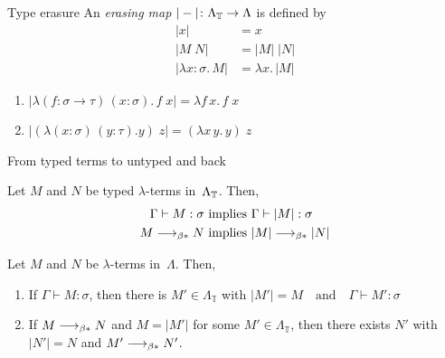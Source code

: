 \begin{frame}{Type erasure}
  An \emph{erasing map} $|-|\colon \Lambda_{\mathbb{T}} \to \Lambda$ is defined by
  \begin{align*}
    |x| & = x \\
    |M\; N| & = |M|\;|N| \\
    |\lambda x:\sigma.\, M| & = \lambda x.\, |M|
  \end{align*}
  \begin{enumerate}
    \item $|\lambda (f: \sigma \to \tau)\,(x: \sigma).\, f\;x| = \lambda f\, x.\, f\;x$
    \item $|(\lambda (x: \sigma)\,(y: \tau). y)\;z| = (\lambda x\,y.\, y)\; z$
  \end{enumerate}
  
\end{frame}
\begin{frame}{From typed terms to untyped and back}
\begin{proposition}
  Let $M$ and $N$ be typed $\lambda$-terms in~$\Lambda_{\mathbb{T}}$. Then, 
  \begin{align*}
    \Gamma  \vdash M : \sigma & \text{ implies } \Gamma \vdash |M| :
    \sigma \\ 
    M \longrightarrow_{\beta*} N & \text{ implies } |M| \longrightarrow_{\beta*} |N|
  \end{align*}
\end{proposition}

\begin{proposition}
  Let $M$ and $N$ be $\lambda$-terms in~$\Lambda$. Then, 
  \begin{enumerate}
    \item If $\Gamma \vdash M : \sigma$, then there is $M' \in \Lambda_{\mathbb{T}}$ with 
        $|M'| = M
        \quad\text{and}\quad
        \Gamma \vdash M' : \sigma$
      \item If $M \longrightarrow_{\beta*} N$ and $M = |M'|$ for some $M' \in \Lambda_{\mathbb{T}}$,
      then there exists $N'$ with $|N'| = N$ and $M' \longrightarrow_{\beta*} N'$.
    \end{enumerate}
\end{proposition}
\end{frame}

